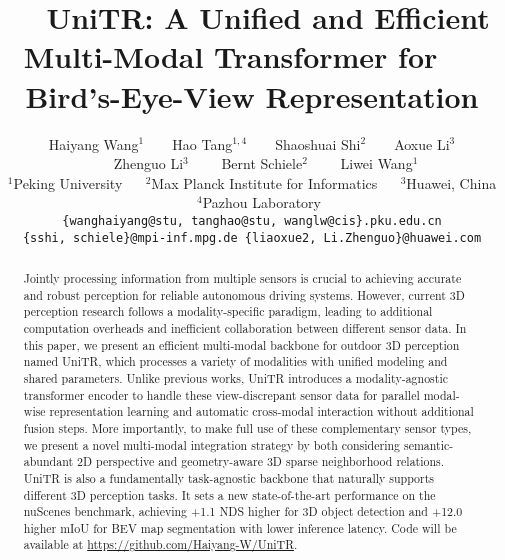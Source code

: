 \documentclass[10pt,twocolumn,letterpaper]{article}
\begin{document}
\title{~~UniTR: A Unified and Efficient Multi-Modal Transformer for ~~ Bird's-Eye-View Representation}

\author{
Haiyang Wang$^{1}$\footnotemark[1] ~~~~Hao Tang$^{1,4}$\footnotemark[1] ~~~~Shaoshuai Shi$^{2}$\footnotemark[2] ~~~~Aoxue Li$^{3}$  \\
~~~~Zhenguo Li$^{3}$  ~~~~Bernt Schiele$^{2}$  ~~~~Liwei Wang$^{1}$\footnotemark[2]   \\
{\normalsize{\hspace*{-14pt}}
}
{\normalsize
{$^1$}Peking University ~~ {$^2$}Max Planck Institute for Informatics ~~ {$^3$}Huawei, China ~~{$^4$}Pazhou Laboratory}\\
{\normalsize{\hspace*{-18pt}}
}
{\tt\small \{wanghaiyang@stu, tanghao@stu, wanglw@cis\}.pku.edu.cn}\\
{\tt\small \{sshi, schiele\}@mpi-inf.mpg.de  \{liaoxue2, Li.Zhenguo\}@huawei.com}
}

\maketitle
\renewcommand{\thefootnote}{\fnsymbol{footnote}}
\ificcvfinal\thispagestyle{empty}\fi


\begin{abstract}
Jointly processing information from multiple sensors is crucial to achieving accurate and robust perception for reliable autonomous driving systems. However, current 3D perception research follows a modality-specific paradigm, leading to additional computation overheads and inefficient collaboration between different sensor data. In this paper, we present an efficient multi-modal backbone for outdoor 3D perception named UniTR, which processes a variety of modalities with unified modeling and shared parameters. Unlike previous works, UniTR introduces a modality-agnostic transformer encoder to handle these view-discrepant sensor data for parallel modal-wise representation learning and automatic cross-modal interaction without additional fusion steps. More importantly, to make full use of these complementary sensor types, we present a novel multi-modal integration strategy by both considering semantic-abundant 2D perspective and geometry-aware 3D sparse neighborhood relations. UniTR is also a fundamentally task-agnostic backbone that naturally supports different 3D perception tasks. It sets a new state-of-the-art performance on the nuScenes benchmark, achieving +1.1 NDS higher for 3D object detection and +12.0 higher mIoU for BEV map segmentation with lower inference latency. Code will be available at \url{https://github.com/Haiyang-W/UniTR}.

\end{abstract}
\end{document}
